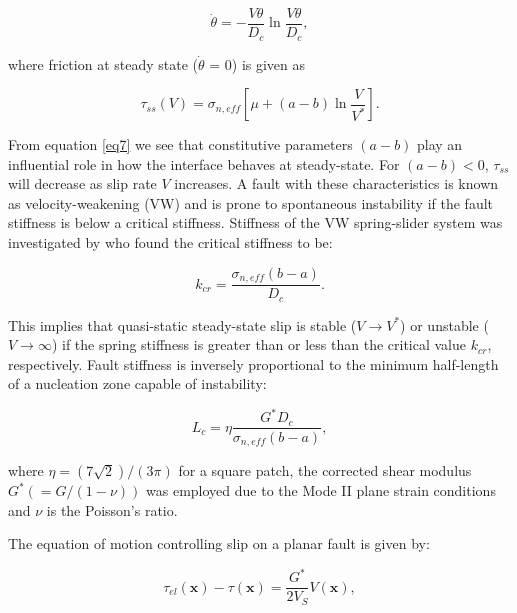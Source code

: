 \documentclass[preprint,1p, 10pt,authoryear]{elsarticle}
\begin{document}
\begin{equation}
\label{eq6}
\dot{\theta} = - \frac{V\theta}{D_{c}}\ln\frac{V\theta}{D_{c}},
\end{equation}   

\noindent where friction at steady state ($\dot{\theta} $ = 0) is given as

\begin{equation}
\label{eq7}
\tau_{ss} \left( V \right) = \sigma_{n,eff} \left[\mu + \left(a - b \right)\ln\frac{V}{V^{*}}\right].
\end{equation}   

\noindent From equation \eqref{eq7} we see that constitutive parameters $\left(a - b \right)$ play an influential role in how the interface behaves at steady-state.  For $\left(a - b \right) < 0$, $\tau_{ss}$ will decrease as slip rate $V$ increases.  A fault with these characteristics is known as velocity-weakening (VW) and is prone to spontaneous instability if the fault stiffness is below a critical stiffness. Stiffness of the VW spring-slider system was investigated by \citet{Ranjith1999} who found the critical stiffness to be:

\begin{equation}
\label{eq9}
k_{cr}=\frac{\sigma_{n,eff} \left( b-a \right)}{D_{c}}.
\end{equation}   

\noindent  This implies that quasi-static steady-state slip is stable ($V \rightarrow V^{*}$) or unstable ($V \rightarrow \infty$) if the spring stiffness is greater than or less than the critical value $k_{cr}$, respectively. Fault stiffness is inversely proportional to the minimum half-length of a nucleation zone capable of instability:

\begin{equation}
\label{eq8}
L_{c} = \eta \frac{G^{*} D_{c}}{ \sigma_{n,eff} \left( b-a\right)},
\end{equation}   

\noindent where $\eta = (7\sqrt{2})/(3\pi)$ \citep{Dieterich1992} for a square patch, the corrected shear modulus $G^{*} (= G/(1-\nu))$ was employed due to the Mode II plane strain conditions and $\nu$ is the Poisson's ratio. 

The equation of motion controlling slip on a planar fault is given by:

\begin{equation}
\label{eq8a}
\tau_{el}\left( \mathbf{x} \right) - \tau\left( \mathbf{x} \right) = \frac{G^{*}}{2 V_{S}} V(\mathbf{x}),
\end{equation}  
\end{document}
